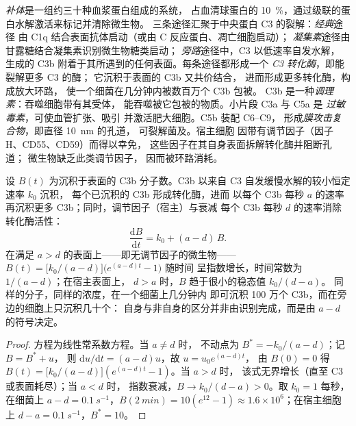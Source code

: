\begin{definition}[补体]\label{def:b3:innate-immunity:complement}
\emph{补体}是一组约三十种血浆蛋白组成的系统，
占血清球蛋白的 \qty{10}{\%}，通过级联的蛋白水解激活来标记并清除微生物。
三条途径汇聚于中央蛋白 C3 的裂解：\emph{经典}途径
由 C1q 结合表面抗体启动（或由 C 反应蛋白、凋亡细胞启动）；
\emph{凝集素}途径由甘露糖结合凝集素识别微生物糖类启动；
\emph{旁路}途径中，C3 以低速率自发水解，
生成的 C3b 附着于其所遇到的任何表面。每条途径都形成一个
\emph{C3 转化酶}，即能裂解更多 C3 的酶；
它沉积于表面的 C3b 又共价结合，
进而形成更多转化酶，构成放大环路，
使一个细菌在几分钟内被数百万个 C3b 包被。
C3b 是一种\emph{调理素}：吞噬细胞带有其受体，
能吞噬被它包被的物质。小片段 C3a 与 C5a 是
\emph{过敏毒素}，可使血管扩张、吸引
并激活肥大细胞。C5b 装配 C6--C9，
形成\emph{膜攻击复合物}，即直径 \qty{10}{nm} 的孔道，
可裂解菌及。宿主细胞
因带有调节因子（因子 H、CD55、CD59）而得以幸免，
这些因子在其自身表面拆解转化酶并阻断孔道；
微生物缺乏此类调节因子，
因而被环路消耗。
\end{definition}

\begin{theorem}[补体环路作为动力学判别机制]\label{thm:b3:innate-immunity:complement}
设 $B(t)$ 为沉积于表面的 C3b 分子数。C3b
以来自 C3 自发缓慢水解的较小恒定速率 $k_{0}$ 沉积，
每个已沉积的 C3b 形成转化酶，进而
以每个 C3b 每秒 $a$ 的速率再沉积更多 C3b；同时，调节因子（宿主）与衰减
每个 C3b 每秒 $d$ 的速率消除转化酶活性：
\[
\frac{\mathrm{d}B}{\mathrm{d}t} = k_{0} + (a - d)\,B .
\]
在满足 $a > d$ 的表面上——即无调节因子的微生物——
$B(t) = \bigl[k_{0}/(a-d)\bigr]\bigl(e^{(a-d)t} - 1\bigr)$ 随时间
呈指数增长，时间常数为 $1/(a - d)$；在宿主表面上，
$d > a$ 时，$B$ 趋于很小的稳态值 $k_{0}/(d - a)$。
同样的分子，同样的浓度，在一个细菌上几分钟内
即可沉积 100 万个 C3b，而在旁边的细胞上只沉积几十个：
自身与非自身的区分并非由识别完成，而是由
$a - d$ 的符号决定。
\end{theorem}
\begin{proof}
方程为线性常系数方程。当 $a \ne d$ 时，
不动点为 $B^{*} = -k_{0}/(a-d)$；记 $B = B^{*} + u$，
则 $\mathrm{d}u/\mathrm{d}t = (a-d)u$，故 $u = u_{0}e^{(a-d)t}$，
由 $B(0) = 0$ 得 $B(t) = \bigl[k_{0}/(a-d)\bigr](e^{(a-d)t} - 1)$。当 $a > d$ 时，
该式无界增长（直至 C3 或表面耗尽）；当 $a < d$ 时，
指数衰减，$B \to k_{0}/(d-a) > 0$。取 $k_{0} = 1$ 每秒，
在细菌上 $a - d = \qty{0.1}{s^{-1}}$，$B(\qty{2}{min})
= 10(e^{12} - 1) \approx 1.6\times 10^{6}$；在宿主细胞上 $d - a =
\qty{0.1}{s^{-1}}$，$B^{*} = 10$。
\end{proof}

